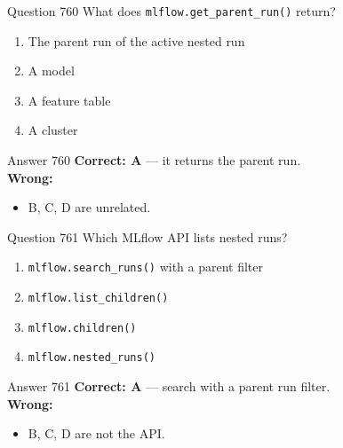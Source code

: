 \documentclass[aspectratio=169,11pt]{beamer}
\begin{document}
	\begin{frame}{Question 760}
		What does \texttt{mlflow.get\_parent\_run()} return?
		\begin{enumerate}[label=\Alph*.]
			\item The parent run of the active nested run
			\item A model
			\item A feature table
			\item A cluster
		\end{enumerate}
	\end{frame}
	\begin{frame}{Answer 760}
		\textbf{Correct: A} --- it returns the parent run.\\
		\vspace{0.5em}
		\textbf{Wrong:}
		\begin{itemize}
			\item B, C, D are unrelated.
		\end{itemize}
	\end{frame}
	
	\begin{frame}{Question 761}
		Which MLflow API lists nested runs?
		\begin{enumerate}[label=\Alph*.]
			\item \texttt{mlflow.search\_runs()} with a parent filter
			\item \texttt{mlflow.list\_children()}
			\item \texttt{mlflow.children()}
			\item \texttt{mlflow.nested\_runs()}
		\end{enumerate}
	\end{frame}
	\begin{frame}{Answer 761}
		\textbf{Correct: A} --- search with a parent run filter.\\
		\vspace{0.5em}
		\textbf{Wrong:}
		\begin{itemize}
			\item B, C, D are not the API.
		\end{itemize}
	\end{frame}
	
\end{document}
